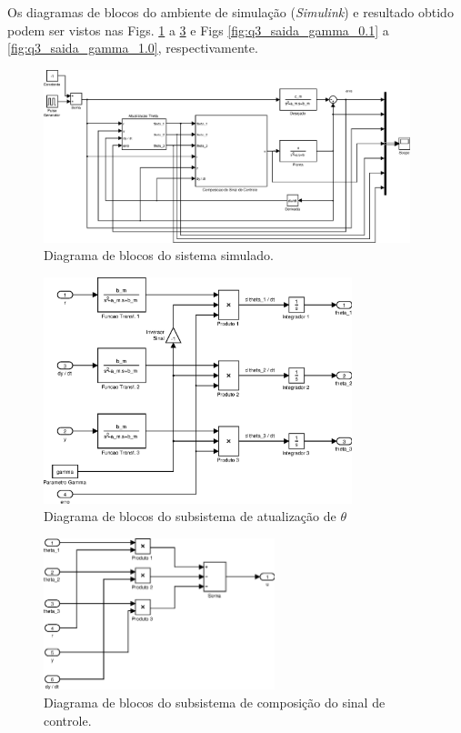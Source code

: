 Os diagramas de blocos do ambiente de simulação ({\it Simulink}) e resultado
obtido podem ser vistos nas Figs. \ref{fig:q3_sistema} a \ref{fig:q3_sinal_cont}
e Figs \ref{fig:q3_saida_gamma_0.1} a \ref{fig:q3_saida_gamma_1.0},
respectivamente.

\begin{figure}[htb]
    \centering
    \includegraphics[width=0.95\textwidth]{imgs/questao3/sistema}
    \caption{Diagrama de blocos do sistema simulado.}
    \label{fig:q3_sistema}
\end{figure}

\begin{figure}[htb]
    \centering
    \includegraphics[width=0.8\textwidth]{imgs/questao3/theta}
    \caption{Diagrama de blocos do subsistema de atualização de $\theta$}
    \label{fig:q3_theta}
\end{figure}

\begin{figure}[htb]
    \centering
    \includegraphics[width=0.6\textwidth]{imgs/questao3/sinal_controle}
    \caption{Diagrama de blocos do subsistema de composição do sinal de
             controle.}
    \label{fig:q3_sinal_cont}
\end{figure}

